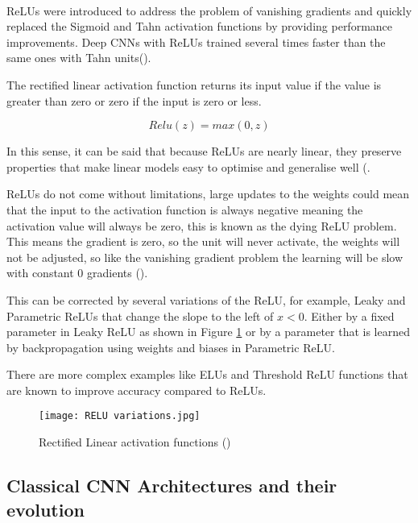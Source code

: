 \paragraph{}
\gls{ReLU}s were introduced to address the problem of vanishing gradients and quickly replaced the Sigmoid and Tahn activation functions by providing performance improvements. Deep \gls{CNN}s with \gls{ReLU}s trained several times faster than the same ones with Tahn units(\cite{GoodBengCour16}).

The rectified linear activation function returns its input value if the value is greater than zero or zero if the input is zero or less.

\begin{equation}
    \label{eq_relu}
    Relu(z) = max(0, z)
\end{equation}

In this sense, it can be said that because \gls{ReLU}s are nearly linear, they preserve properties that make linear models easy to optimise and generalise well (\cite{GoodBengCour16}.

\gls{ReLU}s do not come without limitations, large updates to the weights could mean that the input to the activation function is always negative meaning the activation value will always be zero, this is known as the dying \gls{ReLU} problem. This means the gradient is zero, so the unit will never activate, the weights will not be adjusted, so like the vanishing gradient problem the learning will be slow with constant 0 gradients (\cite{Maas13rectifiernonlinearities}).

This can be corrected by several variations of the \gls{ReLU}, for example, Leaky and Parametric \gls{ReLU}s that change the slope to the left of $x < 0$. Either by a fixed parameter in Leaky \gls{ReLU} as shown in Figure \ref{fig_relu} or by a parameter that is learned by backpropagation using weights and biases in Parametric \gls{ReLU}. 

There are more complex examples like \gls{ELU}s and Threshold \gls{ReLU} functions that are known to improve accuracy compared to \gls{ReLU}s.

\begin{figure}[hbt!]
        \centering
        \texttt{[image: RELU variations.jpg]}
        \caption{Rectified Linear activation functions (\cite{leakyreluimg})}
        \label{fig_relu}
\end{figure}

\subsection{Classical \gls{CNN} Architectures and their evolution} \label{classic_cnn}
